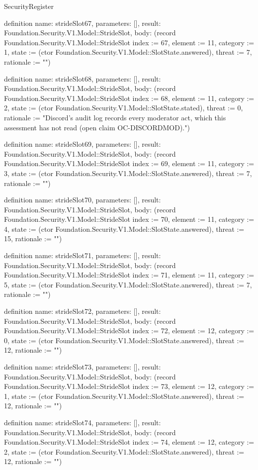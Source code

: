 \begin{lexlean}{SecurityRegister}
\begin{semanticmodule}
definition{
  name: strideSlot67,
  parameters: [],
  result: Foundation.Security.V1.Model::StrideSlot,
  body: (record Foundation.Security.V1.Model::StrideSlot {index := 67, element := 11, category := 1, state := (ctor Foundation.Security.V1.Model::SlotState.answered), threat := 7, rationale := ""})
}

definition{
  name: strideSlot68,
  parameters: [],
  result: Foundation.Security.V1.Model::StrideSlot,
  body: (record Foundation.Security.V1.Model::StrideSlot {index := 68, element := 11, category := 2, state := (ctor Foundation.Security.V1.Model::SlotState.stated), threat := 0, rationale := "Discord's audit log records every moderator act, which this assessment has not read (open claim OC-DISCORDMOD)."})
}

definition{
  name: strideSlot69,
  parameters: [],
  result: Foundation.Security.V1.Model::StrideSlot,
  body: (record Foundation.Security.V1.Model::StrideSlot {index := 69, element := 11, category := 3, state := (ctor Foundation.Security.V1.Model::SlotState.answered), threat := 7, rationale := ""})
}

definition{
  name: strideSlot70,
  parameters: [],
  result: Foundation.Security.V1.Model::StrideSlot,
  body: (record Foundation.Security.V1.Model::StrideSlot {index := 70, element := 11, category := 4, state := (ctor Foundation.Security.V1.Model::SlotState.answered), threat := 15, rationale := ""})
}

definition{
  name: strideSlot71,
  parameters: [],
  result: Foundation.Security.V1.Model::StrideSlot,
  body: (record Foundation.Security.V1.Model::StrideSlot {index := 71, element := 11, category := 5, state := (ctor Foundation.Security.V1.Model::SlotState.answered), threat := 7, rationale := ""})
}

definition{
  name: strideSlot72,
  parameters: [],
  result: Foundation.Security.V1.Model::StrideSlot,
  body: (record Foundation.Security.V1.Model::StrideSlot {index := 72, element := 12, category := 0, state := (ctor Foundation.Security.V1.Model::SlotState.answered), threat := 12, rationale := ""})
}

definition{
  name: strideSlot73,
  parameters: [],
  result: Foundation.Security.V1.Model::StrideSlot,
  body: (record Foundation.Security.V1.Model::StrideSlot {index := 73, element := 12, category := 1, state := (ctor Foundation.Security.V1.Model::SlotState.answered), threat := 12, rationale := ""})
}

definition{
  name: strideSlot74,
  parameters: [],
  result: Foundation.Security.V1.Model::StrideSlot,
  body: (record Foundation.Security.V1.Model::StrideSlot {index := 74, element := 12, category := 2, state := (ctor Foundation.Security.V1.Model::SlotState.answered), threat := 12, rationale := ""})
}


\end{semanticmodule}
\end{lexlean}
